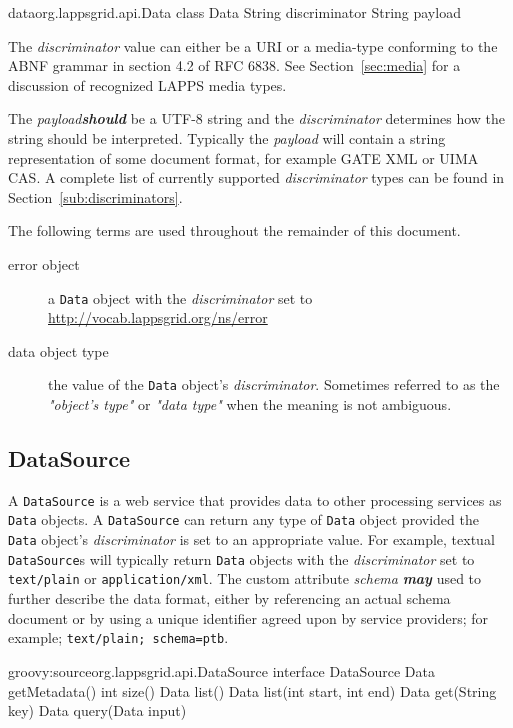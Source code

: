 \documentclass{article}
\newcommand{\lapps}{LAPPS\xspace}
\newcommand{\data}{\texttt{Data}\xspace}
\newcommand{\source}{\texttt{DataSource}\xspace}
\newcommand{\discriminator}{\textit{discriminator}\xspace}
\newcommand{\payload}{\textit{payload}\xspace}
\newcommand{\ns}[1]{\url{http://vocab.lappsgrid.org/ns/#1}}
\newcommand{\definedterm}[1]{\textbf{\textit{#1}}\xspace}
\newcommand{\should}{\definedterm{should}}
\newcommand{\may}{\definedterm{may}}
\renewcommand{\tt}[1]{\texttt{#1}}
\begin{document}
\begin{groovy}{data}{org.lappsgrid.api.Data}
	class Data {
		String discriminator
		String payload
	}
\end{groovy}

The \discriminator value can either be a URI or a media-type conforming to the ABNF grammar in section 4.2 of RFC 6838\cite{rfc6838}. See Section~\ref{sec:media} for a discussion of recognized \lapps media types.

The \payload \should be a UTF-8 string and the \discriminator determines how the string should be interpreted.  Typically the \payload will contain a string representation of some document format, for example GATE XML or UIMA CAS.  A complete list of currently supported \discriminator types can be found in Section~\ref{sub:discriminators}. 

The following terms are used throughout the remainder of this document.

\begin{description}
\item[error object] a \data object with the \discriminator set to \ns{error}
\item[data object type] the value of the \data object's \discriminator. Sometimes referred to as the \emph{"object's type"} or \emph{"data type"} when the meaning is not ambiguous.
\end{description}


\subsection{DataSource}

A \source is a web service that provides data to other processing services as \data objects. A \source can return any type of \data object provided the \data object's \discriminator is set to an appropriate value.  For example, textual \source{}s will typically return \data objects with the \discriminator set to \tt{text/plain} or \tt{application/xml}. The custom attribute \emph{schema}  \may used to further describe the data format, either by referencing an actual schema document or by using a unique identifier agreed upon by service providers; for example; \tt{text/plain; schema=ptb}.

\begin{groovy}{groovy:source}{org.lappsgrid.api.DataSource}
	interface DataSource {
		Data getMetadata()
		int size()
		Data list()
		Data list(int start, int end)
		Data get(String key)
		Data query(Data input)
	}
\end{groovy}
\end{document}

